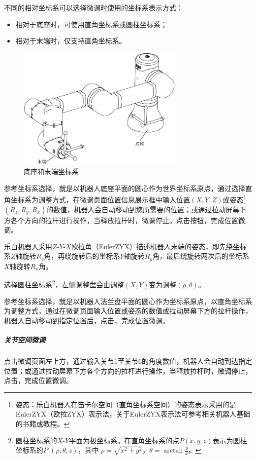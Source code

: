 不同的相对坐标系可以选择微调时使用的坐标系表示方式：
\begin{itemize}
	\item 相对于底座时，可使用直角坐标系或圆柱坐标系；
	\item 相对于末端时，仅支持直角坐标系。
\end{itemize}

\begin{figure}[ht]
	\centering
	\includegraphics[height=6cm]{line_graphs/fine_tuning_coordinate.pdf}
	\caption{底座和末端坐标系}
	\label{fig:坐标空间示意图}
\end{figure}

参考坐标系选择，就是以机器人底座平面的圆心作为世界坐标系原点，通过选择直角坐标系为调整方式，在微调页面位置信息展示框中输入位置$(X, Y, Z)$或姿态\footnote{姿态：乐白机器人在笛卡尔空间（直角坐标系空间）的姿态表示采用的是EulerZYX（欧拉ZYX）表示法，关于EulerZYX表示法可参考相关机器人基础的书籍或教程。}$(R_z, R_y, R_x)$的数值，机器人会自动移动到您所需要的位置；或通过拉动屏幕下方各个方向的拉杆进行操作，当释放拉杆时，微调停止。点击按钮，完成位置微调。

乐白机器人采用$Z\textrm{-}Y\textrm{-}X$欧拉角（EulerZYX）描述机器人末端的姿态，即先绕坐标系$Z$轴旋转$R_z$角，再绕旋转后的坐标系$Y$轴旋转$R_y$角，最后绕旋转两次后的坐标系$X$轴旋转$R_x$角。

选择圆柱坐标系\footnote{圆柱坐标系的$X\textrm{-}Y$平面为极坐标系。在直角坐标系的点$P(x, y, z)$表示为圆柱坐标系的$P'(\rho, \theta, z)$，其中 $\rho=\sqrt{x^2+y^2}$，$\theta=\arctan\frac{y}{x}$。}，左侧调整盘会由调整$(X, Y)$变为调整$(\rho, \theta)$。

参考坐标系选择，就是以机器人法兰盘平面的圆心作为坐标系原点，以直角坐标系为调整方式，通过在微调页面输入位置或姿态的数值或拉动屏幕下方的拉杆操作，机器人自动移动到指定位置后，点击，完成位置微调。

\subparagraph{关节空间微调}
点击微调页面左上方，通过输入关节1至关节6的角度数值，机器人会自动到达指定位置；或通过拉动屏幕下方各个方向的拉杆进行操作，当释放拉杆时，微调停止，点击，完成位置微调。

